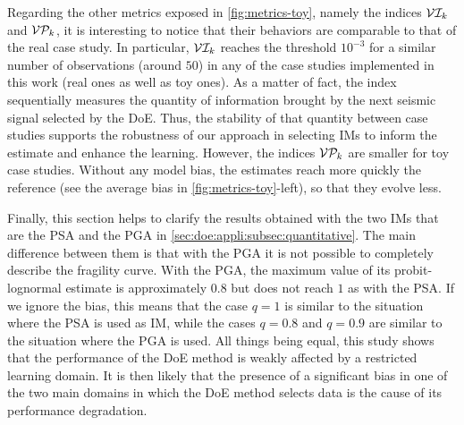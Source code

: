     Regarding the other metrics exposed in  \cref{fig:metrics-toy}, namely the indices $\mathcal{V}\mathcal{I}_k$ and $\mathcal{V}\mathcal{P}_k$, it is interesting to notice that their behaviors are comparable to that of the real case study. In particular, $\mathcal{V}\mathcal{I}_k$ reaches the threshold $10^{-3}$ for a similar number of observations (around $50$) in any of the case studies implemented in this work (real ones as well as toy ones).
    As a matter of fact, the index sequentially measures the quantity of information brought by the next seismic signal selected by the DoE. Thus, the stability of that quantity between case studies supports the robustness of our approach in selecting IMs to inform the estimate and enhance the learning.
    However, the indices $\mathcal{V}\mathcal{P}_k$ are smaller for toy case studies. Without any model bias, the estimates reach more quickly the reference (see the average bias in  \cref{fig:metrics-toy}-left), so that they evolve less.
    
    
    {Finally, this section helps to clarify the results obtained with the two IMs that are the PSA and the PGA in \cref{sec:doe:appli:subsec:quantitative}. The main difference between them is that with the PGA it is not possible to completely describe the fragility curve. With the PGA, the maximum value of its probit-lognormal estimate is approximately $0.8$ but does not reach $1$ as with the PSA. If we ignore the bias, this means that the case $q=1$ is similar to the situation where the PSA is used as IM, while the cases  $q=0.8$ and $q=0.9$ are similar to the situation where the PGA is used. All things being equal, this study shows that the performance of the DoE method is weakly affected by a restricted learning domain. It is then likely that the presence of a significant bias in one of the two main domains in which the DoE method selects data is the cause of its performance degradation.}
    

